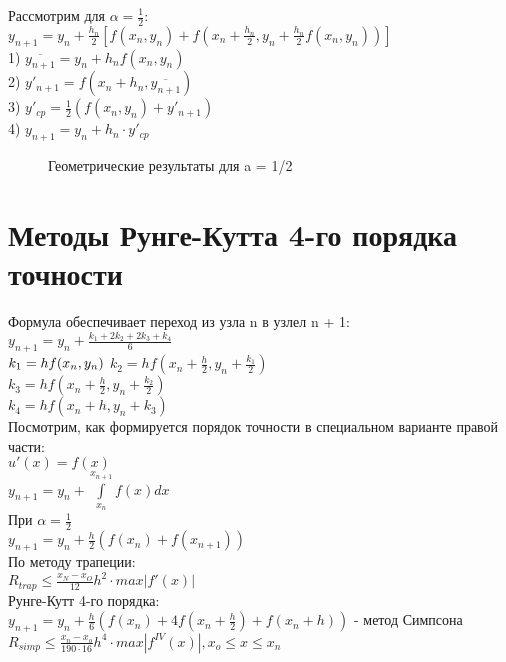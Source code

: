 Рассмотрим для $\alpha = \frac{1}{2}$:\\
$y_{n+1} =  y_{n} + \frac{h_{n}}{2}[f(x_{n}, y_{n}) + f(x_{n} + \frac{h_{n}}{2}, y_{n} + \frac{h_{n}}{2} f (x_{n}, y_{n}))]$\\
1) $\overline{y_{n+1}} = y_{n} + h_{n} f(x_{n}, y_{n})$\\
2) $y'_{n+1} = f(x_{n} + h_{n}, \overline{y_{n+1}})$\\
3) $y'_{cp} = \frac{1}{2}(f(x_{n}, y_{n}) + y'_{n+ 1})$\\
4) $y_{n+1} = y_{n} + h_{n} \cdot y'_{cp}$
\begin{figure}[H]
	\center{\texttt{[image: a\_2]}}
	\caption{Геометрические результаты для a = 1/2}
\end{figure}


\section{Методы Рунге-Кутта 4-го порядка точности}
Формула обеспечивает переход из узла n в узлел n + 1:\\
$y_{n+1} = y_{n} + \frac{k_{1} + 2k_{2} + 2k_{3} + k_{4}}{6}$\\
$k_{1} = h f(x_{n}, y_{n})\\$
$k_{2} = h f (x_{n} + \frac{h}{2}, y_{n} + \frac{k_{1}}{2})$\\
$k_{3} = h f (x_{n} + \frac{h}{2}, y_{n} + \frac{k_{2}}{2})$\\
$k_{4} = h f (x_{n} + h, y_{n} + k_{3})$\\

Посмотрим, как формируется порядок точности в специальном варианте правой части:\\
$u'(x) = f(x)$\\
$y_{n+1} = y_{n} + \int\limits^{x_{n+1}}_{x_{n}}f(x) dx$\\
При $\alpha = \frac{1}{2}$\\
$y_{n+1} = y_{n} + \frac{h}{2}(f(x_{n}) + f(x_{n+1}))$\\
По методу трапеции:\\
$R_{trap} \leqslant \frac{x_{N} - x_{O}}{12} h^{2} \cdot max|f'(x)|$\\
Рунге-Кутт 4-го порядка:\\
$y_{n+1} = y_{n} + \frac{h}{6}(f(x_{n}) + 4f(x_{n} + \frac{h}{2}) + f(x_{n} + h))$ - метод Симпсона\\
$R_{simp} \leqslant \frac{x_{n} - x_{o}}{190 \cdot 16} h^{4} \cdot max|f^{IV}(x)|, x_{o} \leqslant x \leqslant x_{n}$\\

